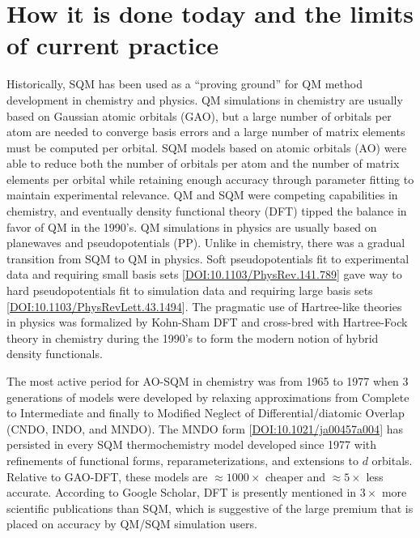 \documentclass[12pt]{article}
\begin{document}
\section{How it is done today and the limits of current practice}

Historically, SQM has been used as a ``proving ground'' for QM method development in chemistry and physics.
QM simulations in chemistry are usually based on Gaussian atomic orbitals (GAO),
 but a large number of orbitals per atom are needed to converge basis errors and a large number of matrix elements must be computed per orbital.
SQM models based on atomic orbitals (AO) were able to reduce both the number of orbitals per atom and the number of matrix elements per orbital
 while retaining enough accuracy through parameter fitting to maintain experimental relevance.
QM and SQM were competing capabilities in chemistry, and eventually density functional theory (DFT)
 tipped the balance in favor of QM in the 1990's.
QM simulations in physics are usually based on planewaves and pseudopotentials (PP).
Unlike in chemistry, there was a gradual transition from SQM to QM in physics.
Soft pseudopotentials fit to experimental data and requiring small basis sets [\href{https://doi.org/10.1103/PhysRev.141.789}{DOI:10.1103/PhysRev.141.789}]
 gave way to hard pseudopotentials fit to simulation data and requiring large basis sets [\href{https://doi.org/10.1103/PhysRevLett.43.1494}{DOI:10.1103/PhysRevLett.43.1494}].
The pragmatic use of Hartree-like theories in physics was formalized by Kohn-Sham DFT and cross-bred with Hartree-Fock theory
 in chemistry during the 1990's to form the modern notion of hybrid density functionals.

The most active period for AO-SQM in chemistry was from 1965 to 1977 when 3 generations of models were developed
 by relaxing approximations from Complete to Intermediate and finally to Modified Neglect of Differential/diatomic Overlap (CNDO, INDO, and MNDO).
The MNDO form [\href{https://doi.org/10.1021/ja00457a004}{DOI:10.1021/ja00457a004}] has persisted in every SQM thermochemistry model developed since 1977
 with refinements of functional forms, reparameterizations, and extensions to $d$ orbitals.
Relative to GAO-DFT, these models are $\approx 1000\times$ cheaper and $\approx 5\times$ less accurate.
According to Google Scholar, DFT is presently mentioned in $3\times$ more scientific publications than SQM,
 which is suggestive of the large premium that is placed on accuracy by QM/SQM simulation users.
\end{document}

